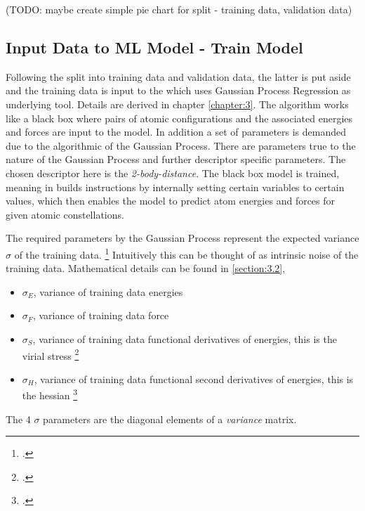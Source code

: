 (TODO: maybe create simple pie chart for split - training data, validation data)

\subsection{Input Data to ML Model - Train Model}
\label{subsection:4.2.4}

Following the split into training data and validation data, the latter is put aside and the training data is input to the  which uses Gaussian Process Regression as underlying tool. Details are derived in chapter \ref{chapter:3}. The algorithm works like a black box where pairs of atomic configurations and the associated energies and forces are input to the model. In addition a set of parameters is demanded due to the algorithmic of the Gaussian Process. There are parameters true to the nature of the Gaussian Process and further descriptor specific parameters. The chosen descriptor here is the \textit{2-body-distance}. The black box model is trained, meaning in builds instructions by internally setting certain variables to certain  values, which then enables the model to predict atom energies and forces for given atomic constellations. 

The required parameters by the Gaussian Process represent the expected variance $\sigma$ of the training data. \footcite[Appendix]{GAP-2009} Intuitively this can be thought of as intrinsic noise of the training data. Mathematical details can be found in \ref{section:3.2}, 
\begin{itemize}
	\item $\sigma_E$, variance of training data energies 
	\item $\sigma_F$, variance of training data force 
	\item $\sigma_S$, variance of training data functional derivatives of energies, this is the virial stress  \footcite[1053]{GAP-intro} 
	\item $\sigma_H$, variance of training data  functional second derivatives of energies, this is the hessian \footcite[1053]{GAP-intro} 
\end{itemize}

The 4 $\sigma $ parameters are the diagonal elements of a \textit{variance} matrix. 


